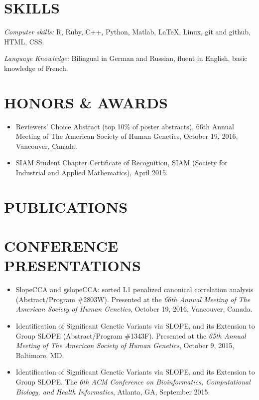 \documentclass[margin]{res} %
\begin{document}
\begin{resume}

\section{SKILLS}

{\sl Computer skills:}
R, Ruby, C++, Python, Matlab, \LaTeX, Linux, git and github, HTML, CSS.

{\sl Language Knowledge:}
Bilingual in German and Russian, fluent in English, basic knowledge of French.

\section{HONORS \& AWARDS}

\begin{itemize}
  \item Reviewers’ Choice Abstract (top 10\% of poster abstracts), 66th Annual Meeting of The American Society of Human Genetics, October 19, 2016, Vancouver, Canada.
  \item SIAM Student Chapter Certificate of Recognition, SIAM (Society for Industrial and Applied Mathematics), April 2015.
\end{itemize}

\section{PUBLICATIONS}


\nocite{*}

\section{CONFERENCE PRESENTATIONS}

\begin{itemize} \itemsep -2pt %
    \item SlopeCCA and gslopeCCA: sorted L1 penalized canonical correlation analysis (Abstract/Program \#2803W). Presented at the {\it 66th Annual Meeting of The American Society of Human Genetics}, October 19, 2016, Vancouver, Canada.
    \item Identification of Significant Genetic Variants via SLOPE, and its Extension to Group SLOPE (Abstract/Program \#1343F). Presented at the {\it 65th Annual Meeting of The American Society of Human Genetics}, October 9, 2015, Baltimore, MD.
  \item Identification of Significant Genetic Variants via SLOPE, and its Extension to Group SLOPE. The {\it 6th ACM Conference on Bioinformatics, Computational Biology, and Health Informatics}, Atlanta, GA, September 2015.
\end{itemize}


\end{resume}
\end{document}
